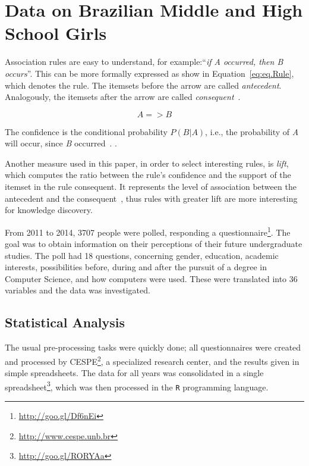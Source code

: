\section{Data on Brazilian Middle and High School Girls}\label{sec:mining}%
Association rules are easy to understand, for example:``\emph{if A occurred, then B occurs}''. This can be more formally expressed as show in Equation~\ref{eq:eq.Rule}, which denotes the rule. The itemsets before the arrow are called \emph{antecedent}. Analogously, the itemsets after the arrow are called \emph{consequent}~\cite{Hastie2009}.

\begin{equation}
{A} => {B}
\label{eq:eq.Rule}%
\end{equation}

The confidence is the conditional probability $P(B|A)$, i.e., the probability of \emph{A} will occur, since \emph{B} occurred~\cite{Hastie2009}. .

Another measure used in this paper, in order to select interesting rules, is \emph{lift}, which computes the ratio between the rule's confidence and the support of the itemset in the rule consequent. It represents the level of association between the antecedent and the consequent~\cite{tan2006introduction}, thus rules with greater lift are more interesting for knowledge discovery.

From 2011 to 2014, 3707 people were polled, responding a questionnaire\footnote{\url{http://goo.gl/Df6nEi}}. The goal was to obtain information on their perceptions of their future undergraduate studies. The poll had 18 questions, concerning gender, education, academic interests, possibilities before, during and after the pursuit of a degree in Computer Science, and how computers were used. These were translated into 36 variables and the data was investigated.

\subsection{Statistical Analysis}\label{sec:mining:stat}%
The usual pre-processing tasks were quickly done; all questionnaires were created and processed by CESPE\footnote{\url{http://www.cespe.unb.br}}, a specialized research center, and the results given in simple spreadsheets. The data for all years was consolidated in a single spreadsheet\footnote{\url{http://goo.gl/RORYAa}}, which was then processed in the \texttt{R} programming language.

